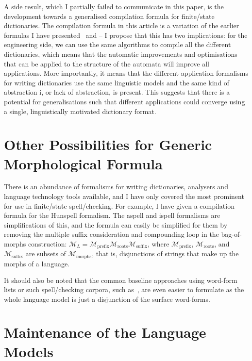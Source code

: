 \documentclass[officiallayout,final]{unihelcompling}
\begin{document}
A side result, which I partially failed to communicate in this paper, is the
development towards a generalised compilation formula for finite\-/state
dictionaries. The compilation formula in this article is a variation of the
earlier formulas I have presented~\citep{linden2009hfst} and
 -- I propose that this has two implications:
for the engineering side, we can use the same algorithms to compile all the
different dictionaries, which means that the automatic improvements and
optimisations that can be applied to the structure of the automata will improve
all applications. More importantly, it means that the different application
formalisms for writing dictionaries use the same linguistic models and the same
kind of abstraction i, or lack of abstraction, is present. This suggests that
there is a potential for generalisations such that different applications could
converge using a single, linguistically motivated dictionary format.

\section{Other Possibilities for Generic Morphological Formula}
\label{sec:other-lms}

There is an abundance of formalisms for writing dictionaries, analysers and
language technology tools available, and I have only covered the most prominent
for use in finite\-/state spell\-/checking. For example, I have given a
compilation formula for the Hunspell formalism. The aspell and ispell
formalisms are simplifications of this, and the formula can easily be
simplified for them by removing the multiple suffix consideration and
compounding loop in the bag-of-morphs construction: $\mathcal{M}_L =
\mathcal{M}_\mathrm{prefix} \mathcal{M}_\mathrm{roots}
\mathcal{M}_\mathrm{suffix}$, where $\mathcal{M}_\mathrm{prefix}$,
$\mathcal{M}_\mathrm{roots}$, and $\mathcal{M}_\mathrm{suffix}$ are subsets of
$\mathcal{M}_\mathrm{morphs}$, that is, disjunctions of strings that make up
the morphs of a language.

It should also be noted that the common baseline approaches using word-form
lists or such spell\-/checking corpora, such as~\citet{norvig2010howto}, are
even easier to formulate as the whole language model is just a disjunction of
the surface word-forms.

\section{Maintenance of the Language Models}
\label{sec:maintenance}
\end{document}
